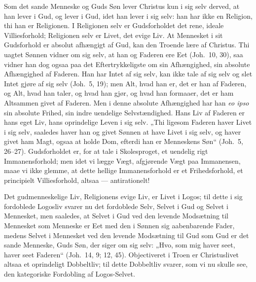 \documentclass[12pt]{book}
\begin{document}
Som det sande Menneske og Guds Søn lever Christus kun i sig selv
derved, at han lever i Gud, og lever i Gud, idet han lever i sig
selv: han har ikke en Religion, thi han er Religionen. I Religionen
selv er Gudsforholdet det rene, ideale Villiesforhold; Religionen
selv er Livet, det evige Liv. At Mennesket i sit Gudsforhold er
absolut afhængigt af Gud, kan den Troende lære af Christus. Thi
uagtet Sønnen vidner om sig selv, at han og Faderen ere Eet
(Joh.\ 10, 30), saa vidner han dog ogsaa paa det
Eftertrykkeligste om sin Afhængighed, sin absolute Afhængighed af
Faderen. Han har Intet af sig selv, kan ikke tale af sig selv og
slet Intet gjøre af sig selv (Joh.\ 5, 19); men Alt, hvad han er,
det er han af Faderen, og Alt, hvad han taler, og hvad han gjør, og
hvad han formaaer, det er ham Altsammen givet af Faderen. Men i
denne absolute Afhængighed har han \textit{eo ipso} sin absolute
Frihed, sin indre uendelige Selvstændighed. Hans Liv af Faderen er
hans eget Liv, hans oprindelige Leven i sig selv. „Thi ligesom
Faderen haver Livet i sig selv, saaledes haver han og givet Sønnen
at have Livet i sig selv, og haver givet ham Magt, ogsaa at holde
Dom, efterdi han er Menneskens Søn“ (Joh.\ 5, 26--27).
Gudsforholdet er, for at tale i Skolesproget, et uendelig rigt
Immanensforhold; men idet vi lægge Vægt, afgjørende Vægt paa
Immanensen, maae vi ikke glemme, at dette hellige Immanensforhold er
et Frihedsforhold, et principielt Villiesforhold, altsaa ---
antirationelt!

Det gudmenneskelige Liv, Religionens evige Liv, er Livet i Logos;
til dette i sig fordoblede Logosliv svarer nu det fordoblede Selv,
Selvet i Gud og Selvet i Mennesket, men saaledes, at Selvet i Gud
ved den levende Modsætning til Mennesket som Menneske er Eet med den
i Sønnen sig aabenbarende Fader, medens Selvet i Mennesket ved den
levende Modsætning til Gud som Gud er det sande Menneske, Guds Søn,
der siger om sig selv: „Hvo, som mig haver seet, haver seet
Faderen“ (Joh.\ 14, 9; 12, 45). Objectiveret i Troen er
Christuslivet altsaa et oprindeligt Dobbeltliv; til dette Dobbeltliv
svarer, som vi nu skulle see, den kategoriske Fordobling af
Logos-Selvet.
\end{document}
